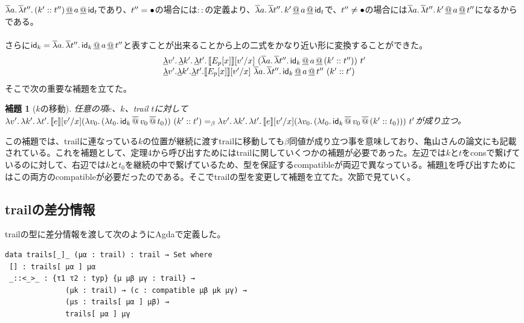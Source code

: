 \documentclass[japanese,draft]{jssst_ppl} %
\newtheorem{lemma}[definition]{補題}
\begin{document}
$\overline{\lambda}{a}.\,{\overline{\lambda}{t''}.\,{(k'::t'')} \,\underline{@}\, a \,\underline{@}\, \textsf{id}_t}$であり、$t''=\bullet$の場合には$::$の定義より、$\overline{\lambda}{a}.\,{\overline{\lambda}{t''}.\,{k' \,\underline{@}\, a \,\underline{@}\, \textsf{id}_t}}$で、$t''\neq \bullet$の場合には$\overline{\lambda}{a}.\,{\overline{\lambda}{t''}.\,{k' \,\underline{@}\, a \,\underline{@}\, t''}}$になるからである。\\
\\
さらに$\textsf{id}_k = \overline{\lambda}{a}.\,{\overline{\lambda}{t''}.\,{\textsf{id}_k \,\underline{@}\, a \,\underline{@}\, t''}}$と表すことが出来ることから上の二式をかなり近い形に変換することができた。
\[
\begin{array}{l}
  \DLam{v'}{\DLam{k'}{\DLam{t'}{\CPSTh{E_p[x]}[\Change{x}{v'}]\
        \SLamP{a}{\SLam{t''}{\Idk \DAppS a \DAppS \ConsP{k'}{t''}}}\ t'}}}\\
  \DLamS v'.\DLamS k'.\DLamS t'.

     \CPSTh{E_p[x]}[\Change{x}{v'}]\
     \SLam{a}{\SLam{t''}{\Idk \DAppS a \DAppS t''}}\ \ConsP{k'}{t'}\\
     
\end{array}
\]
そこで次の重要な補題を立てた。

\begin{lemma}[$k$の移動]
  任意の項$e$、$k$、trail $t$に対して\\
  $\Lam{v'}{\Lam{k'}{\Lam{t'}{\CPSTh{e}[\Change{x}{v'}] \LamP{v_0}{\LamP{t_0}{\SApp{\Idk}{\SApp{v_0}{t_0}}}}\ \ConsP{k'}{t'}}}}
  =_{\beta} \\
  \Lam{v'}{\Lam{k'}{\Lam{t'}{\CPSTh{e}[\Change{x}{v'}] \LamP{v_0}{\LamP{t_0}{\SApp{\Idk}{\SApp{v_0}{\ConsP{k'}{t_0}}}}}\ t'}}}$が成り立つ。
\label{KMove}
\end{lemma}
この補題では、trailに連なっている$k$の位置が継続に渡すtrailに移動しても$\beta$同値が成り立つ事を意味しており、亀山さんの論文\cite{KY2008}にも記載されている。これを補題として、定理4から呼び出すためにはtrailに関していくつかの補題が必要であった。左辺では$k$と$t$を\textsf{cons}で繋げているのに対して、右辺では$k$と$t_0$を継続の中で繋げているため、型を保証する\textsf{compatible}が両辺で異なっている。補題\ref{KMove}を呼び出すためにはこの両方の\textsf{compatible}が必要だったのである。そこでtrailの型を変更して補題を立てた。次節で見ていく。

\subsection{trailの差分情報}
trailの型に差分情報を渡して次のようにAgdaで定義した。


\begin{verbatim}
data trails[_]_ (μα : trail) : trail → Set where
 [] : trails[ μα ] μα
 _::<_>_ : {τ1 τ2 : typ} {μ μβ μγ : trail} →
              (μk : trail) → (c : compatible μβ μk μγ) →
              (μs : trails[ μα ] μβ) →
              trails[ μα ] μγ
\end{verbatim}
\end{document}
